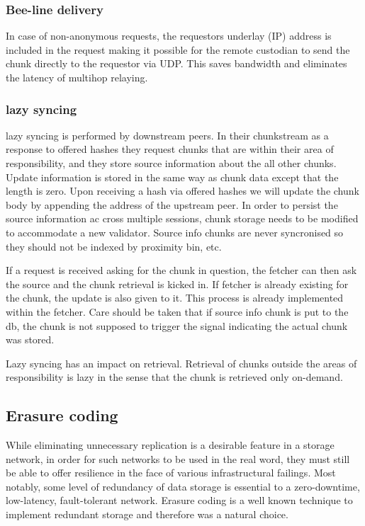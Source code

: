 \subsubsection{Bee-line delivery}

In case of non-anonymous requests, the requestors underlay (IP) address is included in the request making it possible for the remote custodian to send the chunk directly to the requestor via UDP. This  saves bandwidth and eliminates the latency of multihop relaying.


\subsubsection{lazy syncing }

lazy syncing is performed by downstream peers. 
In their chunkstream as a response to offered hashes 
they request chunks that are within their area of responsibility, and they store source information about the all other chunks. Update information is stored in the same way as chunk data except that the length is zero. Upon receiving a hash via offered hashes we will update the chunk body by appending the address of the upstream peer. In order to persist the source information ac
cross multiple sessions, chunk storage needs to be modified to accommodate a new validator. Source info chunks are never syncronised so they should not be indexed by proximity bin, etc. 

If a request is received asking for the chunk in question, the fetcher can then ask the source and the chunk retrieval is kicked in. If fetcher is already existing for the chunk, the update is also given to it. This process is already implemented within the fetcher. Care should be taken that if source info chunk is put to the db, the chunk is not supposed to trigger the signal indicating the actual chunk was stored.

Lazy syncing has an impact on retrieval. Retrieval of chunks outside the areas of responsibility is lazy in the sense that the chunk is retrieved only on-demand.



\subsection{Erasure coding}

While eliminating unnecessary replication is a desirable feature in a storage network, in order for such networks to be used in the real word, they must still be able to offer resilience in the face of various infrastructural failings. Most notably, some level of redundancy of data storage is essential to a zero-downtime, low-latency, fault-tolerant network. Erasure coding is a well known technique to implement redundant storage and therefore was a natural choice.

